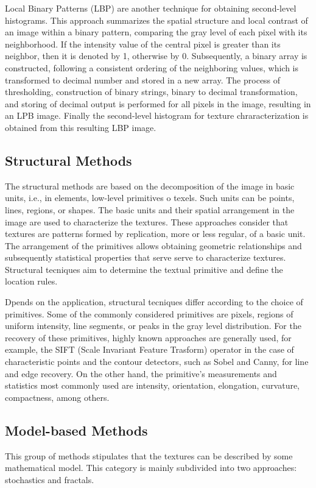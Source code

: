 Local Binary Patterns (LBP) \citep{Ojala.Pietikainen.ea:PR:1996} are another technique for obtaining second-level histograms. This approach summarizes the spatial structure and local contrast of an image within a binary pattern, comparing the gray level of each pixel with its neighborhood. If the intensity value of the central pixel is greater than its neighbor, then it is denoted by 1, otherwise by 0. Subsequently, a binary array is constructed, following a consistent ordering of the neighboring values, which is transformed to decimal number and stored in a new array. The process of thresholding, construction of binary strings, binary to decimal transformation, and storing of decimal output is performed for all pixels in the image, resulting in an LPB image. Finally the second-level histogram for texture chraracterization is obtained from this resulting LBP image.

\subsection{Structural Methods}
The structural methods are based on the decomposition of the image in basic units, i.e., in elements, low-level primitives o texels. Such units can be points, lines, regions, or shapes. The basic units and their spatial arrangement in the image are used to characterize the textures. These approaches consider that textures are patterns formed by replication, more or less regular, of a basic unit. The arrangement of the primitives allows obtaining geometric relationships and subsequently statistical properties that serve serve to characterize textures. Structural tecniques aim to determine the textual primitive and define the location rules.

Dpends on the application, structural tecniques differ according to the choice of primitives. Some of the commonly considered primitives are pixels, regions of uniform intensity, line segments, or peaks in the gray level distribution. For the recovery of these primitives, highly known approaches are generally used, for example, the SIFT (Scale Invariant Feature Trasform) operator in the case of characteristic points and the contour detectors, such as Sobel and Canny, for line and edge recovery. On the other hand, the primitive's measurements and statistics most commonly used are intensity, orientation, elongation, curvature, compactness, among others.

\subsection{Model-based Methods}
This group of methods stipulates that the textures can be described by some mathematical model. This category is mainly subdivided into two approaches: stochastics and fractals.

